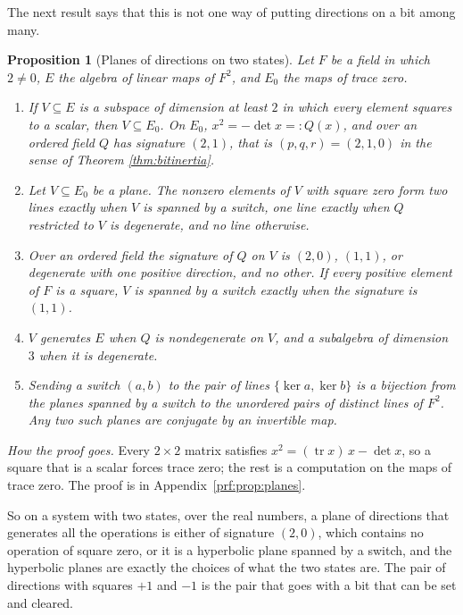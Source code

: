 \documentclass[11pt]{article}
\theoremstyle{plain}
\theoremstyle{definition}
\theoremstyle{plain}
\newtheorem{proposition}[theorem]{Proposition}
\theoremstyle{definition}
\begin{document}
The next result says that this is not one way of putting directions on a bit among many.

\begin{proposition}[Planes of directions on two states]\label{prop:planes}
Let $F$ be a field in which $2 \neq 0$, $E$ the algebra of linear maps of $F^{2}$, and $E_{0}$ the maps of trace zero.
\begin{enumerate}
\item[(i)] If $V \subseteq E$ is a subspace of dimension at least $2$ in which every element squares to a scalar, then $V \subseteq E_{0}$. On $E_{0}$, $x^{2} = -\det x =: Q(x)$, and over an ordered field $Q$ has signature $(2,1)$, that is $(p,q,r) = (2,1,0)$ in the sense of Theorem \ref{thm:bitinertia}.
\item[(ii)] Let $V \subseteq E_{0}$ be a plane. The nonzero elements of $V$ with square zero form two lines exactly when $V$ is spanned by a switch, one line exactly when $Q$ restricted to $V$ is degenerate, and no line otherwise.
\item[(iii)] Over an ordered field the signature of $Q$ on $V$ is $(2,0)$, $(1,1)$, or degenerate with one positive direction, and no other. If every positive element of $F$ is a square, $V$ is spanned by a switch exactly when the signature is $(1,1)$.
\item[(iv)] $V$ generates $E$ when $Q$ is nondegenerate on $V$, and a subalgebra of dimension $3$ when it is degenerate.
\item[(v)] Sending a switch $(a, b)$ to the pair of lines $\{\ker a, \ker b\}$ is a bijection from the planes spanned by a switch to the unordered pairs of distinct lines of $F^{2}$. Any two such planes are conjugate by an invertible map.
\end{enumerate}
\end{proposition}

\noindent\emph{How the proof goes.} Every $2 \times 2$ matrix satisfies $x^{2} = (\operatorname{tr} x)\,x - \det x$, so a square that is a scalar forces trace zero; the rest is a computation on the maps of trace zero. The proof is in Appendix~\ref{prf:prop:planes}.

So on a system with two states, over the real numbers, a plane of directions that generates all the operations is either of signature $(2,0)$, which contains no operation of square zero, or it is a hyperbolic plane spanned by a switch, and the hyperbolic planes are exactly the choices of what the two states are. The pair of directions with squares $+1$ and $-1$ is the pair that goes with a bit that can be set and cleared.
\end{document}
